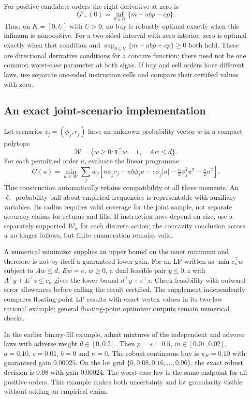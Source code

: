 For positive candidate orders the right derivative at zero is
\[
 \underline G'_+(0)=\inf_{\theta\in\mathcal U}\{m-abp-cp\}.
\]
Thus, on $K=[0,U]$ with $U>0$, no buy is robustly optimal exactly when
this infimum is nonpositive. For a two-sided interval with zero interior,
zero is optimal exactly when that condition and
$\sup_{\theta\in\mathcal U}\{m-abp+cp\}\ge0$ both hold.
These are directional derivative conditions for a concave function;
there need not be one common worst-case parameter at both signs.
If buy and sell orders have different laws, use separate one-sided
instruction cells and compare their certified values with zero.

\subsection{An exact joint-scenario implementation}

Let scenarios $z_j=(\phi_j,r_j)$ have an unknown probability vector
$w$ in a compact polytope
\[
 \mathcal W=\{w\ge0:\boldsymbol1^\top w=1,\quad Aw\le d\}.
\]
For each permitted order $u$, evaluate the linear programme
\begin{equation}\label{eq:scenarioLP}
 \underline G(u)=\min_{w\in\mathcal W}\sum_j w_j
 \left[u\phi_jr_j-ab\phi_ju-c\phi_j|u|
       -\tfrac a2\phi_j^2u^2-\tfrac\kappa2u^2\right].
\end{equation}
This construction automatically retains compatibility of all three moments.
An $\ell_1$ probability ball about empirical frequencies is representable
with auxiliary variables. Its radius requires valid coverage for the
joint sample, not separate accuracy claims for returns and fills.
If instruction laws depend on size, use a separately supported
$\mathcal W_u$ for each discrete action; the concavity conclusion across
$u$ no longer follows, but finite enumeration remains valid.

A numerical minimizer supplies an upper bound on the inner minimum and
therefore is not by itself a guaranteed lower gain. For an LP written as
$\min c_u^\top w$ subject to $Aw\le d$, $Ew=e$, $w\ge0$, a dual feasible
pair $y\le0,z$ with $A^\top y+E^\top z\le c_u$ gives the lower bound
$d^\top y+e^\top z$. Check feasibility with outward error allowances
before calling the result certified. The supplement independently compares
floating-point LP results with exact vertex values in its two-law rational
example; general floating-point optimizer outputs remain numerical checks.

In the earlier binary-fill example, admit mixtures of the independent and
adverse laws with adverse weight $\theta\in[0,0.2]$. Then
$p=s=0.5$, $m\in[0.01,0.02]$, $a=0.10$, $c=0.01$, $b=0$ and
$\kappa=0$. The robust continuous buy is $u_R=0.10$ with guaranteed gain
$0.00025$. On the lot grid $\{0,0.08,0.16,\ldots,0.96\}$, the exact
robust decision is $0.08$ with gain $0.00024$. The worst-case law is the
same endpoint for all positive orders. This example makes both uncertainty
and lot granularity visible without adding an empirical claim.

